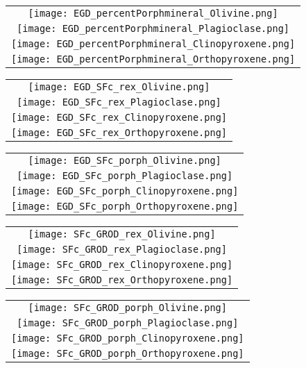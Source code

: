 \documentclass{article}
\begin{document}
\newpage

\begin{tabular}{c}
\texttt{[image: EGD\_percentPorphmineral\_Olivine.png]}
\\
\texttt{[image: EGD\_percentPorphmineral\_Plagioclase.png]}
\\
\texttt{[image: EGD\_percentPorphmineral\_Clinopyroxene.png]}
\\
\texttt{[image: EGD\_percentPorphmineral\_Orthopyroxene.png]}
\end{tabular}

\newpage

\begin{tabular}{c}
\texttt{[image: EGD\_SFc\_rex\_Olivine.png]}
\\
\texttt{[image: EGD\_SFc\_rex\_Plagioclase.png]}
\\
\texttt{[image: EGD\_SFc\_rex\_Clinopyroxene.png]}
\\
\texttt{[image: EGD\_SFc\_rex\_Orthopyroxene.png]}
\end{tabular}

\newpage

\begin{tabular}{c}
\texttt{[image: EGD\_SFc\_porph\_Olivine.png]}
\\
\texttt{[image: EGD\_SFc\_porph\_Plagioclase.png]}
\\
\texttt{[image: EGD\_SFc\_porph\_Clinopyroxene.png]}
\\
\texttt{[image: EGD\_SFc\_porph\_Orthopyroxene.png]}
\end{tabular}

\newpage

\begin{tabular}{c}
\texttt{[image: SFc\_GROD\_rex\_Olivine.png]}
\\
\texttt{[image: SFc\_GROD\_rex\_Plagioclase.png]}
\\
\texttt{[image: SFc\_GROD\_rex\_Clinopyroxene.png]}
\\
\texttt{[image: SFc\_GROD\_rex\_Orthopyroxene.png]}
\end{tabular}

\newpage

\begin{tabular}{c}
\texttt{[image: SFc\_GROD\_porph\_Olivine.png]}
\\
\texttt{[image: SFc\_GROD\_porph\_Plagioclase.png]}
\\
\texttt{[image: SFc\_GROD\_porph\_Clinopyroxene.png]}
\\
\texttt{[image: SFc\_GROD\_porph\_Orthopyroxene.png]}
\end{tabular}
\end{document}
